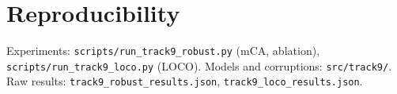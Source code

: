 \documentclass[conference]{IEEEtran}
\begin{document}
\section*{Reproducibility}
Experiments: \texttt{scripts/run\_track9\_robust.py} (mCA, ablation),
\texttt{scripts/run\_track9\_loco.py} (LOCO). Models and corruptions:
\texttt{src/track9/}. Raw results: \texttt{track9\_robust\_results.json},
\texttt{track9\_loco\_results.json}.



\end{document}
